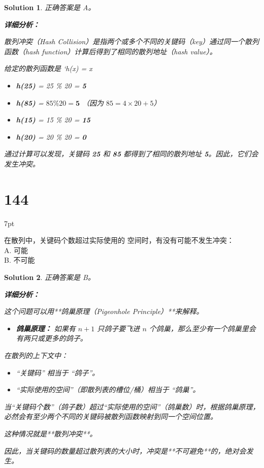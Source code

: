 \documentclass[UTF8]{report}
\newtheorem{solution}{Solution}
\theoremstyle{MyLineTheoremStyle} %
\theoremstyle{MyBlockTheoremStyle} %
\theoremstyle{MySubsubsectionStyle} %
\newenvironment{graybox}{%
        \def\FrameCommand{%
        \hspace{1pt}%
        {\color{gray}\small \vrule width 2pt}%
        {\color{graybox_color}\vrule width 4pt}%
        \colorbox{graybox_color}%
        }%
        \MakeFramed{\advance\hsize-\width\FrameRestore}%
        \noindent\hspace{-4.55pt}%
        \begin{adjustwidth}{}{7pt}%
        \vspace{2pt}\vspace{2pt}%
        }
        {%
        \vspace{2pt}\end{adjustwidth}\endMakeFramed%
        }
\begin{document}
\begin{solution}
正确答案是 A。

\textbf{详细分析：}

散列冲突（Hash Collision）是指两个或多个不同的关键码（key）通过同一个散列函数（hash function）计算后得到了相同的散列地址（hash value）。

给定的散列函数是 `h(x) = x %

\begin{itemize}
    \item \textbf{h(25)} = 25 \% 20 = \textbf{5}
    \item \textbf{h(85)} = $85 \% 20 = \textbf{5}$ \quad （因为 $85 = 4 \times 20 + 5$）
    \item \textbf{h(15)} = 15 \% 20 = \textbf{15}
    \item \textbf{h(20)} = 20 \% 20 = \textbf{0}
\end{itemize}

通过计算可以发现，关键码 \textbf{25} 和 \textbf{85} 都得到了相同的散列地址 \textbf{5}。因此，它们会发生冲突。
\end{solution}

\section*{144}
\begin{graybox}
在散列中，关键码个数超过实际使用的
空间时，有没有可能不发生冲突：\\
A. 可能\\
B. 不可能
\end{graybox}

\begin{solution}
正确答案是 B。

\textbf{详细分析：}

这个问题可以用**鸽巢原理（Pigeonhole Principle）**来解释。

\begin{itemize}
    \item \textbf{鸽巢原理：} 如果有 $n+1$ 只鸽子要飞进 $n$ 个鸽巢，那么至少有一个鸽巢里会有两只或更多的鸽子。
\end{itemize}

在散列的上下文中：
\begin{itemize}
    \item “关键码” 相当于 “鸽子”。
    \item “实际使用的空间”（即散列表的槽位/桶）相当于 “鸽巢”。
\end{itemize}

当“关键码个数”（鸽子数）超过“实际使用的空间”（鸽巢数）时，根据鸽巢原理，必然会有至少两个不同的关键码被散列函数映射到同一个空间位置。

这种情况就是**散列冲突**。

因此，当关键码的数量超过散列表的大小时，冲突是**不可避免**的，绝对会发生。
\end{solution}
\end{document}
